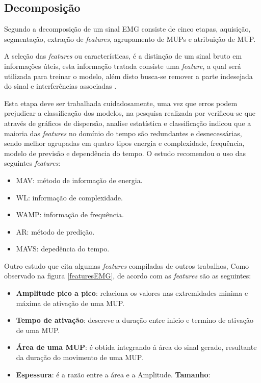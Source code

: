 \subsection{Decomposição}
Segundo  a decomposição de um sinal EMG consiste de cinco etapas, aquisição, segmentação, extração de \textit{features}, agrupamento de MUPs e atribuição de MUP.

A seleção das \textit{features} ou características, é a distinção de um sinal bruto em informações úteis, esta informação tratada consiste uma \textit{feature}, a qual será utilizada para treinar o modelo, além disto busca-se remover a parte indesejada do sinal e interferências associadas \cite{phinyomark2012feature}.

Esta etapa deve ser trabalhada cuidadosamente, uma vez que erros podem prejudicar a classificação dos modelos, na pesquisa realizada por \cite{phinyomark2012feature} verificou-se que através de gráficos de dispersão, analise estatística e classificação indicou que a maioria das \textit{features} no domínio do tempo são redundantes e desnecessárias, sendo melhor agrupadas em quatro tipos energia e complexidade, frequência, modelo de previsão e dependência do tempo. O estudo recomendou o uso das seguintes \textit{features}:

\begin{itemize}
    \item MAV: método de informação de energia.
    \item WL: informação de complexidade.
    \item WAMP: informação de frequência.
    \item AR: método de predição.
    \item MAVS: depedência  do tempo.
\end{itemize}

Outro estudo que cita algumas \textit{features} compiladas de outros trabalhos, Como observado na figura \ref{featuresEMG}, de acordo com  as \textit{features} são as seguintes:

\begin{itemize}
    \item \textbf{Amplitude pico a pico}: relaciona os valores nas extremidades minima e máxima de ativação de uma MUP.
    \item \textbf{Tempo de ativação}: descreve a duração entre inicio e termino de ativação de uma MUP.
    \item \textbf{Área de uma MUP}: é obtida integrando á área do sinal gerado, resultante da duração do movimento de uma MUP.
    \item \textbf{Espessura}: é a razão entre a área e a Amplitude.
    \textbf{Tamanho}:
\end{itemize}

